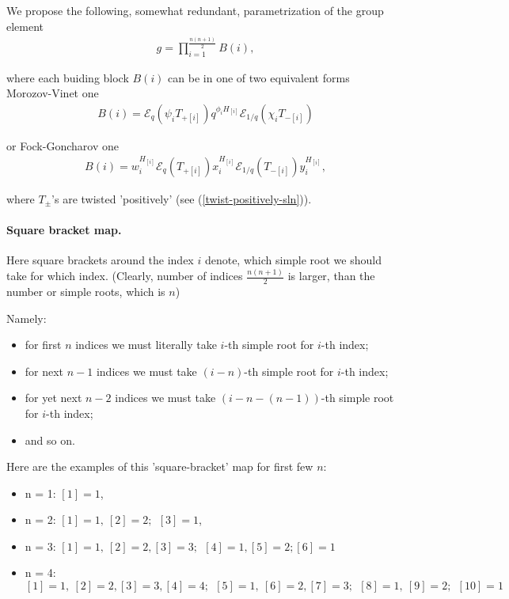 \documentclass{article}
\newcommand{\lb}{\left (}
\newcommand{\rb}{\right )}
\newcommand{\B}[1]{\lb #1 \rb}
\newcommand{\lsb}{\left [}
\newcommand{\rsb}{\right ]}
\newcommand{\SB}[1]{\lsb #1 \rsb}
\newcommand{\be}{\begin{eqnarray}}
\newcommand{\ee}{\end{eqnarray}}
\newcommand {\?}{\textit{???}}
\newcommand{\me}[0]{\mathcal{E}}
\newcommand{\Tp}[1][]{T_{+ #1}}
\newcommand{\Tm}[1][]{T_{- #1}}
\newcommand{\delabel}[1]{(\ref{#1})}
\begin{document}
We propose the following, somewhat redundant, parametrization of the group element
\be
\label{quantum-group-element-sln}
g = \prod_{i = 1}^{\frac{n(n+1)}{2}}B(i),
\ee

where each buiding block $B(i)$ can be in one of two equivalent forms \\
Morozov-Vinet one
\be
\label{building-block-mv-sln}
B(i) = \me_q \B{\psi_i \Tp[\SB{i}]} q^{\phi_i H_{[i]}} \me_{1/q} \B{\chi_i \Tm[\SB{i}]}
\ee

or Fock-Goncharov one
\be
\label{building-block-sln-fg}
B(i) = w_i^{H_{[i]}} \me_q \B{\Tp[\SB{i}]} x_i^{H_{[i]}} \me_{1/q} \B{\Tm[\SB{i}]} y_i^{H_{[i]}},
\ee

where $T_\pm$'s are twisted 'positively' (see \delabel{twist-positively-sln}).

\paragraph{Square bracket map.} Here square brackets around the index $i$ denote, which simple root
we should take for which index. (Clearly, number of indices $\frac{n(n + 1)}{2}$ is larger, than the number
or simple roots, which is $n$)

Namely:
\begin{itemize}
  \item for first $n$ indices we must literally take $i$-th simple root for $i$-th index;
\item for next $n - 1$ indices we must take $(i - n)$-th simple root for $i$-th index;
  \item for yet next $n - 2$ indices we must take $(i - n - (n - 1))$-th simple root for $i$-th index;
\item and so on.
\end{itemize}

Here are the examples of this 'square-bracket' map for first few $n$:
\begin{itemize}
\item n = 1: $\SB{1} = 1$,
\item n = 2: $\SB{1} = 1,\ \SB{2} = 2;\ \
  \SB{3} = 1$,
\item n = 3: $\SB{1} = 1,\ \SB{2} = 2, \SB{3} = 3;\ \ 
  \SB{4} = 1, \SB{5} = 2;
  \SB{6} = 1$
\item n = 4: $\SB{1} = 1,\ \SB{2} = 2, \SB{3} = 3, \SB{4} = 4;\ \
  \SB{5} = 1,\ \SB{6} = 2, \SB{7} = 3;\ \
  \SB{8} = 1,\ \SB{9} = 2;\ \
  \SB{10} = 1$
\end{itemize}
\end{document}
